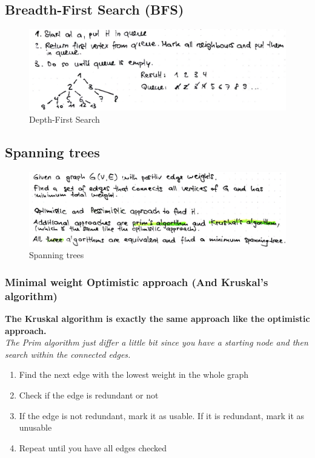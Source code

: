 \subsection{Breadth-First Search (BFS)}

\begin{figure}[H]
\centering
\includegraphics[width=1\textwidth]{figures/bfs.png}
\caption{Depth-First Search}
\end{figure}

\subsection{Spanning trees}

\begin{figure}[H]
\centering
\includegraphics[width=1\textwidth]{figures/spanningtree.png}
\caption{Spanning trees}
\end{figure}

\subsubsection{Minimal weight Optimistic approach (And Kruskal’s algorithm)}

\textbf{The Kruskal algorithm is exactly the same approach like the optimistic approach.} \\
\textit{The Prim algorithm just differ a little bit since you have a starting node and then search within the connected edges.}

\begin{enumerate}
    \item Find the next edge with the lowest weight in the whole graph
    \item Check if the edge is redundant or not
    \item If the edge is not redundant, mark it as usable. If it is redundant, mark it as unusable
    \item Repeat until you have all edges checked
\end{enumerate}

